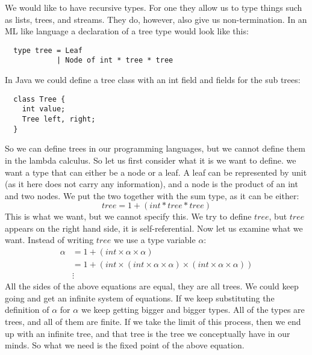 We would like to have recursive types. For one they allow us to type things such as lists, trees, and streams. They do, however, also give us non-termination. In an ML like language a declaration of a tree type would look like this:
\begin{lstlisting}
  type tree = Leaf
            | Node of int * tree * tree
\end{lstlisting}
In Java we could define a tree class with an int field and fields for the sub trees:
\begin{lstlisting}
  class Tree {
    int value;
    Tree left, right;
  }
\end{lstlisting}
So we can define trees in our programming languages, but we cannot define them in the lambda calculus. So let us first consider what it is we want to define. we want a type that can either be a node or a leaf. A leaf can be represented by unit (as it here does not carry any information), and a node is the product of an int and two nodes. We put the two together with the sum type, as it can be either:
\[
  tree = 1 + (int * tree * tree)
\]
This is what we want, but we cannot specify this. We try to define $tree$, but $tree$ appears on the right hand side, it is self-referential. Now let us examine what we want. Instead of writing $tree$ we use a type variable $\alpha$:
\begin{align*}
  \alpha &= 1 + (int \times \alpha \times \alpha) \\
         &= 1 + (int \times (int \times \alpha \times \alpha) \times (int \times \alpha \times \alpha)) \\
  &\vdots
\end{align*}
All the sides of the above equations are equal, they are all trees. We could keep going and get an infinite system of equations. If we keep substituting the definition of $\alpha$ for $\alpha$ we keep getting bigger and bigger types. All of the types are trees, and all of them are finite. If we take the limit of this process, then we end up with an infinite tree, and that tree is the tree we conceptually have in our minds. So what we need is the fixed point of the above equation.

